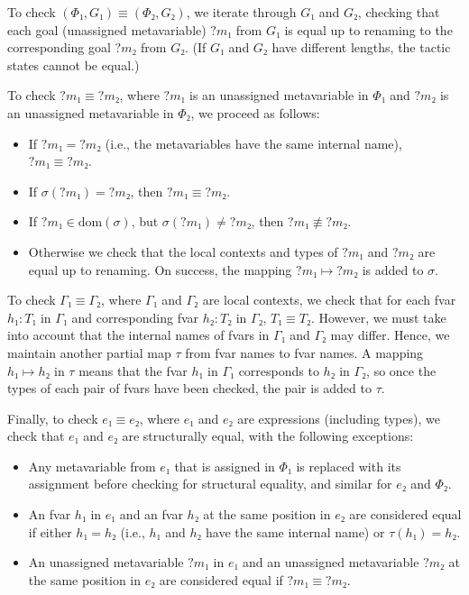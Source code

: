 \documentclass[sigplan,10pt,anonymous,review]{acmart}
\newcommand{\mvar}[1]{{?#1}}
\newcommand{\dom}{\ensuremath{\mathrm{dom}}}
\begin{document}
To check $(Φ₁, G₁) ≡ (Φ₂, G₂)$, we iterate through $G₁$ and $G₂$, checking that each goal (unassigned metavariable) $\mvar{m₁}$ from $G₁$ is equal up to renaming to the corresponding goal $\mvar{m₂}$ from $G₂$.
(If $G₁$ and $G₂$ have different lengths, the tactic states cannot be equal.)

To check $\mvar{m₁} ≡ \mvar{m₂}$, where $\mvar{m₁}$ is an unassigned metavariable in $Φ₁$ and $\mvar{m₂}$ is an unassigned metavariable in $Φ₂$, we proceed as follows:
\begin{itemize}
  \item If $\mvar{m₁} = \mvar{m₂}$ (i.e., the metavariables have the same internal name), $\mvar{m₁} ≡ \mvar{m₂}$.
  \item If $σ(\mvar{m₁}) = \mvar{m₂}$, then $\mvar{m₁} ≡ \mvar{m₂}$.
  \item If $\mvar{m₁} ∈ \dom(σ)$, but $σ(\mvar{m₁}) ≠ \mvar{m₂}$, then $\mvar{m₁} ≢ \mvar{m₂}$.
  \item Otherwise we check that the local contexts and types of $\mvar{m₁}$ and $\mvar{m₂}$ are equal up to renaming.
        On success, the mapping $\mvar{m₁} ↦ \mvar{m₂}$ is added to $σ$.
\end{itemize}

To check $Γ₁ ≡ Γ₂$, where $Γ₁$ and $Γ₂$ are local contexts, we check that for each fvar $h₁ : T₁$ in $Γ₁$ and corresponding fvar $h₂ : T₂$ in $Γ₂$, $T₁ ≡ T₂$.
However, we must take into account that the internal names of fvars in $Γ₁$ and $Γ₂$ may differ.
Hence, we maintain another partial map $τ$ from fvar names to fvar names.
A mapping $h₁ ↦ h₂$ in $τ$ means that the fvar $h₁$ in $Γ₁$ corresponds to $h₂$ in $Γ₂$, so once the types of each pair of fvars have been checked, the pair is added to $τ$.

Finally, to check $e₁ ≡ e₂$, where $e₁$ and $e₂$ are expressions (including types), we check that $e₁$ and $e₂$ are structurally equal, with the following exceptions:
\begin{itemize}
  \item Any metavariable from $e₁$ that is assigned in $Φ₁$ is replaced with its assignment before checking for structural equality, and similar for $e₂$ and $Φ₂$.
  \item An fvar $h₁$ in $e₁$ and an fvar $h₂$ at the same position in $e₂$ are considered equal if either $h₁ = h₂$ (i.e., $h₁$ and $h₂$ have the same internal name) or $τ(h₁) = h₂$.
  \item An unassigned metavariable $\mvar{m₁}$ in $e₁$ and an unassigned metavariable $\mvar{m₂}$ at the same position in $e₂$ are considered equal if $\mvar{m₁} ≡ \mvar{m₂}$.
\end{itemize}
\end{document}
